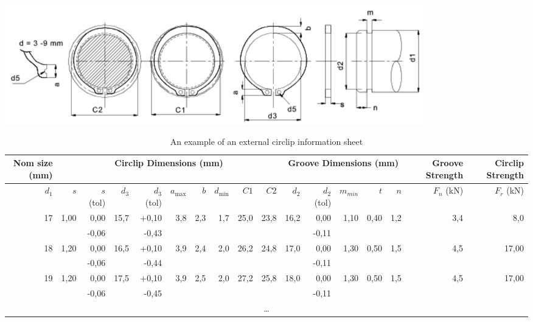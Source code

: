 \begin{table}[h!]
    \caption{An example of an external circlip information sheet}\label{tbl-circlip}
    \centering
    \scriptsize
    \includegraphics[width=0.8\textwidth]{09_fixtures_and_fittings/circlip-dimensions.png}
    \begin{tabular}{r r r r r r r r r r r r r r r r r}
    \toprule
    \multicolumn{1}{p{0.05\textwidth}}{Nom size (\si{\milli\metre})} & 
    \multicolumn{9}{c}{Circlip Dimensions (\si{\milli\metre})} &
    \multicolumn{5}{c}{Groove Dimensions (\si{\milli\metre})} & 
    \multicolumn{1}{p{0.05\textwidth}}{Groove Strength} & 
    \multicolumn{1}{p{0.05\textwidth}}{Circlip Strength} \\
    \midrule
    $d_1$ & $s$ & $s$ (tol) & $d_3$ & $d_3$ (tol) & $a_{\max}$ & $b$ & $d_{\min}$ & $C1$ & $C2$ & $d_2$ & $d_2$ (tol) & $m_{min}$ & $t$ & $n$ & $F_n$ (kN) & $F_r$ (kN) \\
    \midrule
    
    17 & 1,00 & 0,00 & 15,7 & +0,10 & 3,8 & 2,3 & 1,7 & 25,0 & 23,8 & 16,2 & 0,00 & 1,10 & 0,40 & 1,2 & 3,4 & 8,0 \\
    & & -0,06 & & -0,43 & & & & & & & -0,11 & & & & & \\
    
    18 & 1,20 & 0,00 & 16,5 & +0,10 & 3,9 & 2,4 & 2,0 & 26,2 & 24,8 & 17,0 & 0,00 & 1,30 & 0,50 & 1,5 & 4,5 & 17,00 \\
    & & -0,06 & & -0,44 & & & & & & & -0,11 & & & & & \\
    
    19 & 1,20 & 0,00 & 17,5 & +0,10 & 3,9 & 2,5 & 2,0 & 27,2 & 25,8 & 18,0 & 0,00 & 1,30 & 0,50 & 1,5 & 4,5 & 17,00 \\
    & & -0,06 & & -0,45 & & & & & & & -0,11 & & & & & \\
    
    \multicolumn{17}{c}{\ldots} \\
    
    \bottomrule
    
    \end{tabular}
\end{table}

